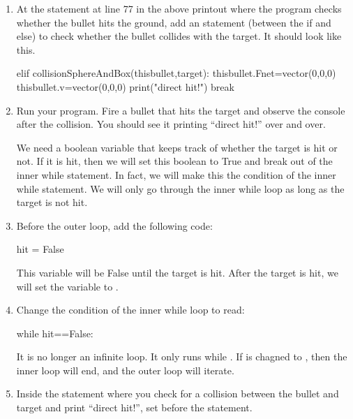 \begin{enumerate}
	\item At the  statement at line 77 in the above printout where the program checks whether the bullet hits the ground, add an  statement (between the if and else) to check whether the bullet collides with the target. It should look like this.
	
\begin{myvpython}
            elif collisionSphereAndBox(thisbullet,target):
                thisbullet.Fnet=vector(0,0,0)
                thisbullet.v=vector(0,0,0)
                print("direct hit!")
                break
\end{myvpython}

	\item Run your program. Fire a bullet that hits the target and observe the console after the collision. You should see it printing ``direct hit!'' over and over.
	

	We need a boolean variable that keeps track of whether the target is hit or not. If it is hit, then we will set this boolean to True and break out of the inner while statement. In fact, we will make this the condition of the inner while statement. We will only go through the inner while loop as long as the target is not hit.
	
	\item Before the outer  loop, add the following code:
	
\begin{myvpython}
	hit = False
\end{myvpython}

This variable  will be False until the target is hit. After the target is hit, we will set the variable to .

	\item Change the condition of the inner while loop to read:
	
\begin{myvpython}
    while hit==False:
\end{myvpython}
    
    It is no longer an infinite loop. It only runs while . If  is chagned to , then the inner loop will end, and the outer loop will iterate.
    
	\item Inside the  statement where you check for a collision between the bullet and target and print ``direct hit!'', set  before the  statement.
	

\end{enumerate}
